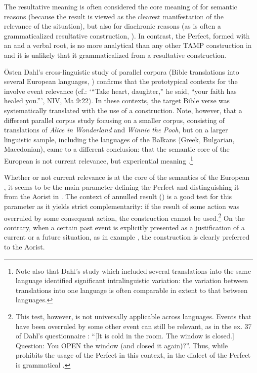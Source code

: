 \documentclass[output=paper,newtxmath,modfonts,nonflat,hidelinks]{langsci/langscibook}
\begin{document}
The resultative meaning is often considered the core meaning of  for semantic reasons (because the result is viewed as the clearest manifestation of the relevance of the situation), but also for diachronic reasons (as  is often a grammaticalized resultative construction, \citealt{khachplung2016}). In contrast, the  Perfect, formed with an  and a verbal root, is no more analytical than any other TAMP construction in  and it is unlikely that it grammaticalized from a resultative construction. 

Östen Dahl's cross-linguistic study of parallel corpora (Bible translations into several European languages, \citealt{khachdahl2014}) confirms that the prototypical contexts for the  involve event relevance (cf.: `{}``Take heart, daughter,'' he said, ``your faith has healed you.''{}', NIV, Ma 9:22). In these contexts, the target Bible verse was systematically translated with the use of a  construction. Note, however, that a different parallel corpus study focusing on a smaller corpus, consisting of translations of \textit{Alice in Wonderland} and \textit{Winnie the Pooh}, but on a larger linguistic sample, including the languages of the Balkans (Greek, Bulgarian, Macedonian), came to a different conclusion: that the semantic core of the European  is not current relevance, but experiential meaning \citep{khachsich2016}.\footnote{Note also that Dahl's study which included several translations into the same language identified significant intralinguistic variation: the variation between translations into one language is often comparable in extent to that between languages.}

Whether or not current relevance is at the core of the semantics of the European , it seems to be the main parameter defining the Perfect and distinguishing it from the Aorist in . The context of annulled result () is a good test for this parameter as it yields strict complementarity: if the result of some action was overruled by some consequent action, the  construction cannot be used.\footnote{This test, however, is not universally applicable across languages. Events that have been overruled by some other event can still be relevant, as in the ex. 37 of Dahl's questionnaire \citep[803]{khachdahl2000}: ``[It is cold in the room. The window is closed.] Question: You OPEN the window (and closed it again)?''. Thus, while  prohibits the usage of the Perfect in this context, in the  dialect of  the Perfect is grammatical \citep{khachmaisak2016}.} On the contrary, when a certain past event is explicitly presented as a justification of a current or a future situation, as in example , the  construction is clearly preferred to the Aorist.
\end{document}
